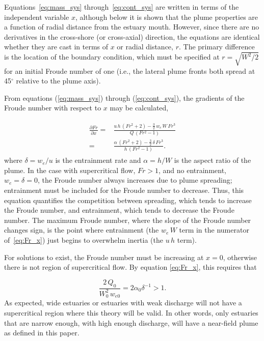 \documentclass[11pt]{report}
\numberwithin{equation}{section}
\begin{document}
Equations~\ref{eq:mass_sys} through~\ref{eq:cont_sys} are written in terms of the independent variable $x$, although below it is shown that the plume properties are a function of radial distance from the estuary mouth.  However, since there are no derivatives in the cross-shore (or cross-axial) direction, the equations are identical whether they are cast in terms of $x$ or radial distance, $r$.  The primary difference is the location of the boundary condition, which must be specified at $r = \sqrt{W^2 / 2}$ for an initial Froude number of one (i.e., the lateral plume fronts both spread at 45$^\circ{}$ relative to the plume axis).

From equations (\ref{eq:mass_sys}) through (\ref{eq:cont_sys}), the gradients of the Froude number with respect to $x$ may be calculated,

\begin{align}
\begin{split}
\frac{\partial Fr}{\partial x} 
=& \frac{ u\,h\,(Fr^2+2) - \frac{3}{2}\,w_e\,W\,Fr^3}{ Q\,(Fr^2-1)} \\
=& \frac{ \alpha\,(Fr^2+2) - \frac{3}{2}\,\delta\,Fr^3}{ h\,(Fr^2-1)}.
\end{split}
\label{eq:Fr_x}
\end{align}
where $\delta = w_e/u$ is the entrainment rate and $\alpha = h/W$ is the aspect ratio of the plume.  In the case with supercritical flow, $Fr>1$, and no entrainment, $w_e=\delta=0$, the Froude number always increases due to plume spreading; entrainment must be included for the Froude number to decrease.  Thus, this equation quantifies the competition between spreading, which tends to increase the Froude number, and entrainment, which tends to decrease the Froude number.  The maximum Froude number, where the slope of the Froude number changes sign, is the point where entrainment (the $w_e\,W$ term in the numerator of~\ref{eq:Fr_x}) just begins to overwhelm inertia (the $u\,h$ term).

For solutions to exist, the Froude number must be increasing at $x=0$, otherwise there is not region of supercritical flow.  By equation  \ref{eq:Fr_x}, this requires that

\begin{equation}
  \frac{2\,Q_0}{W_0^2\,w_{e0}} = 2\alpha_0\delta^{-1} > 1.
\end{equation}
As expected, wide estuaries or estuaries with weak discharge will not have a supercritical region where this theory will be valid.  In other words, only estuaries that are narrow enough, with high enough discharge, will have a near-field plume as defined in this paper.
\end{document}
